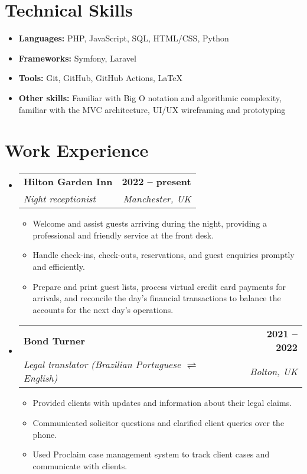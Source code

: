 \documentclass[a4paper,12pt]{article}
\makeatletter
\newcommand{\resumeSubHeadingListStart}{\begin{itemize}[leftmargin=0in, label={}]}
\newcommand{\resumeSubHeadingListEnd}{\end{itemize}}
\newcommand{\resumeSubheading}[4]{
  \item
    \begin{tabular*}{\textwidth}[t]{l@{\extracolsep{\fill}}r}
      \textbf{#1} & #2 \\
      \textit{#3} & \textit{#4} \\
    \end{tabular*}\vspace{-2pt}
}
\newcommand{\resumeItem}[1]{\item #1}
\newcommand{\resumeItemListStart}{\begin{itemize}[leftmargin=2em, label=\textbullet, itemsep=2pt]}
\newcommand{\resumeItemListEnd}{\end{itemize}}
\makeatother
\begin{document}
\section{Technical Skills}
\resumeItemListStart
    \resumeItem{\textbf{Languages:} PHP, JavaScript, SQL, HTML/CSS, Python}
    \resumeItem{\textbf{Frameworks:} Symfony, Laravel}
    \resumeItem{\textbf{Tools:} Git, GitHub, GitHub Actions, \LaTeX}
    \resumeItem{\textbf{Other skills:} Familiar with Big O notation and algorithmic complexity, familiar with the MVC architecture, UI/UX wireframing and prototyping}
\resumeItemListEnd

\vfill

\section{Work Experience}
\resumeSubHeadingListStart

    \resumeSubheading
    {Hilton Garden Inn}{\bfseries{2022 -- present}}
    {Night receptionist}{Manchester, UK}
        \resumeItemListStart
            \resumeItem{Welcome and assist guests arriving during the night, providing a professional and friendly service at the front desk.}
            \resumeItem{Handle check-ins, check-outs, reservations, and guest enquiries promptly and efficiently.}
            \resumeItem{Prepare and print guest lists, process virtual credit card payments for arrivals, and reconcile the day’s financial transactions to balance the accounts for the next day’s operations.}
        \resumeItemListEnd

\resumeSubHeadingListEnd

\resumeSubHeadingListStart
    \resumeSubheading
    {Bond Turner}{\bfseries{2021 -- 2022}}
    {Legal translator (Brazilian Portuguese \(\rightleftharpoons\) English)}{Bolton, UK}
        \resumeItemListStart
            \resumeItem{Provided clients with updates and information about their legal claims.}
            \resumeItem{Communicated solicitor questions and clarified client queries over the phone.}
            \resumeItem{Used Proclaim case management system to track client cases and communicate with clients.}
        \resumeItemListEnd

\resumeSubHeadingListEnd
\end{document}
